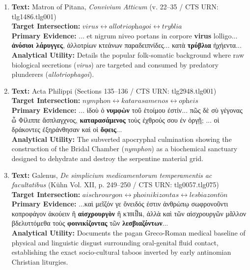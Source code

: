 \documentclass[11pt,twoside,a4paper]{article}
\begin{document}
\begin{enumerate}
    \item \textbf{Text:} Matron of Pitana, \textit{Convivium Atticum} (v. 22--35 / CTS URN: tlg1486.tlg001) \\
    \textbf{Target Intersection:} $\textit{virus} \leftrightarrow \textit{allotriophagoi} \leftrightarrow \textit{tryblia}$ \\
    \textbf{Primary Evidence:} ... et nigrum niveo portans in corpore \textbf{virus} lolligo... \textbf{ἀνόσιοι λάρυγγες}, ἀλλοτρίων κτεάνων παραδειπνίδες... κατὰ \textbf{τρύβλια} ἠχήεντα... \\
    \textbf{Analytical Utility:} Details the popular folk-somatic background where raw biological secretions (\textit{virus}) are targeted and consumed by predatory plunderers (\textit{allotriophagoi}).
    \item \textbf{Text:} Acta Philippi (Sections 135--136 / CTS URN: tlg2948.tlg001) \\
    \textbf{Target Intersection:} $\textit{nymphon} \leftrightarrow \textit{katarasamenos} \leftrightarrow \textit{opheis}$ \\
    \textbf{Primary Evidence:} ... ἰδοὺ ὁ \textbf{νυμφὼν} τοῦ ἑτοίμου ἐστίν... πῶς δὲ σὺ γέγονας ὦ Φίλιππε ἄσπλαγχνος, \textbf{καταρασάμενος} τοὺς ἐχθρούς σου ἐν ὀργῇ; ... οἱ δράκοντες ἐξηράνθησαν καὶ οἱ \textbf{ὄφεις}... \\
    \textbf{Analytical Utility:} The subverted apocryphal culmination showing the construction of the Bridal Chamber (\textit{nymphon}) as a biochemical sanctuary designed to dehydrate and destroy the serpentine material grid.
    \item \textbf{Text:} Galenus, \textit{De simplicium medicamentorum temperamentis ac facultatibus} (Kühn Vol. XII, p. 249--250 / CTS URN: tlg0057.tlg075) \\
    \textbf{Target Intersection:} $\textit{aischrourgon} \leftrightarrow \textit{phoinikizontas} \leftrightarrow \textit{lesbiazontōn}$ \\
    \textbf{Primary Evidence:} ...καὶ μεῖζόν γε ὄνειδός ἐστιν ἀνθρώπῳ σωφρονοῦντι κοπροφάγον ἀκούειν ἢ \textbf{αἰσχρουργὸν} ἢ κายเป็น, ἀλλὰ καὶ τῶν αἰσχρουργῶν μᾶλλον βδελυττόμεθα τοὺς \textbf{φοινικίζοντας} τῶν \textbf{λεσβιαζόντων}... \\
    \textbf{Analytical Utility:} Documents the pagan Greco-Roman medical baseline of physical and linguistic disgust surrounding oral-genital fluid contact, establishing the exact socio-cultural taboos inverted by early antinomian Christian liturgies.


\end{enumerate}
\end{document}
